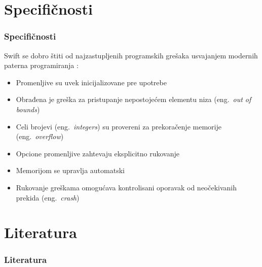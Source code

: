 \documentclass{beamer}
\begin{document}
\section{Specifičnosti}
\begin{frame}
\frametitle{Specifičnosti}

Swift se dobro štiti od najzastupljenih programskih grešaka usvajanjem modernih paterna programiranja \cite{swift_sajt}:
\begin{itemize}
\item Promenljive su uvek inicijalizovane pre upotrebe
\item Obrađena je greška za pristupanje nepostojećem elementu niza (eng.~{\em out of bounds})
\item Celi brojevi (eng.~{\em integers}) su provereni za prekoračenje memorije (eng.~{\em overflow})
\item Opcione promenljive zahtevaju eksplicitno rukovanje
\item Memorijom se upravlja automatski
\item Rukovanje greškama omogućava kontrolisani oporavak od neočekivanih prekida (eng.~{\em crash})
\end{itemize}

\end{frame}

\section{Literatura}

\begin{frame}
\frametitle{Literatura}



\end{frame}
\end{document}
